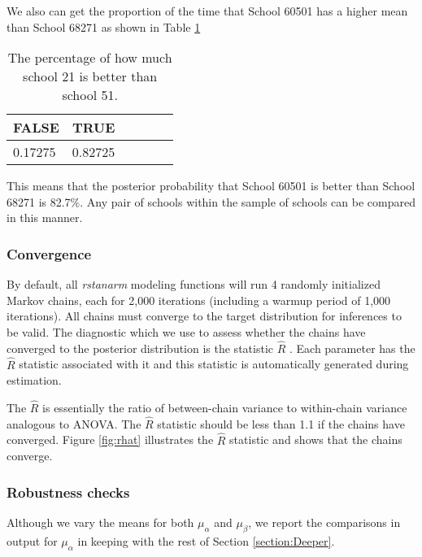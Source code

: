 We also can get the proportion of the time that School 60501 has a higher mean than School 68271 as shown in Table \ref{tab:comparison}

\begin{table}[ht]
	\centering
	\def\arraystretch{1.3}
	{\small
		\begin{tabular}{l | c c c c c}
			FALSE & TRUE \\
			\hline
			0.17275 & 0.82725
		\end{tabular}
	}
	\caption{{\small The percentage of how much school 21 is better than school 51.}}
	\label{tab:comparison}
\end{table}

This means that the posterior probability that School 60501 is better than School 68271 is 82.7\%. Any pair of schools within the sample of schools can be compared in this manner.

\subsubsection{Convergence}
By default, all \textit{rstanarm} modeling functions will run 4 randomly initialized Markov chains, each for 2,000 iterations (including a warmup period of 1,000 iterations). All chains must converge to the target distribution for inferences to be valid. The diagnostic which we use to assess whether the chains have converged to the posterior distribution is the statistic $\hat{R}$ \cite{gelman1992inference}. Each parameter has the $\hat{R}$ statistic associated with it and this statistic is automatically generated during estimation.


The $\hat{R}$ is essentially the ratio of between-chain variance to within-chain variance analogous to ANOVA. The $\hat{R}$ statistic should be less than 1.1 if the chains have converged. Figure \ref{fig:rhat} illustrates the $\hat{R}$ statistic and shows that the chains converge.


\subsubsection{Robustness checks}

Although we vary the means for both $\mu_{\alpha}$ and $\mu_{\beta}$, we report the comparisons in output for $\mu_{\alpha}$ in keeping with the rest of Section \ref{section:Deeper}.

